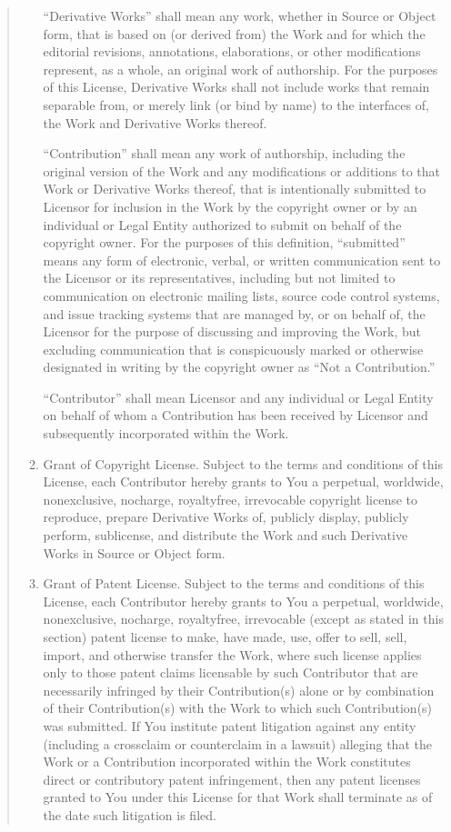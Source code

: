 \documentclass[letterpaper,10pt,english,openany,oneside]{sphinxmanual}
\begin{document}
\begin{quote}
\begin{enumerate}
“Derivative Works” shall mean any work, whether in Source or Object
form, that is based on (or derived from) the Work and for which the
editorial revisions, annotations, elaborations, or other modifications
represent, as a whole, an original work of authorship. For the purposes
of this License, Derivative Works shall not include works that remain
separable from, or merely link (or bind by name) to the interfaces of,
the Work and Derivative Works thereof.

“Contribution” shall mean any work of authorship, including
the original version of the Work and any modifications or additions
to that Work or Derivative Works thereof, that is intentionally
submitted to Licensor for inclusion in the Work by the copyright owner
or by an individual or Legal Entity authorized to submit on behalf of
the copyright owner. For the purposes of this definition, “submitted”
means any form of electronic, verbal, or written communication sent
to the Licensor or its representatives, including but not limited to
communication on electronic mailing lists, source code control systems,
and issue tracking systems that are managed by, or on behalf of, the
Licensor for the purpose of discussing and improving the Work, but
excluding communication that is conspicuously marked or otherwise
designated in writing by the copyright owner as “Not a Contribution.”

“Contributor” shall mean Licensor and any individual or Legal Entity
on behalf of whom a Contribution has been received by Licensor and
subsequently incorporated within the Work.

\item {} 
Grant of Copyright License. Subject to the terms and conditions of
this License, each Contributor hereby grants to You a perpetual,
worldwide, non\sphinxhyphen{}exclusive, no\sphinxhyphen{}charge, royalty\sphinxhyphen{}free, irrevocable
copyright license to reproduce, prepare Derivative Works of,
publicly display, publicly perform, sublicense, and distribute the
Work and such Derivative Works in Source or Object form.

\item {} 
Grant of Patent License. Subject to the terms and conditions of
this License, each Contributor hereby grants to You a perpetual,
worldwide, non\sphinxhyphen{}exclusive, no\sphinxhyphen{}charge, royalty\sphinxhyphen{}free, irrevocable
(except as stated in this section) patent license to make, have made,
use, offer to sell, sell, import, and otherwise transfer the Work,
where such license applies only to those patent claims licensable
by such Contributor that are necessarily infringed by their
Contribution(s) alone or by combination of their Contribution(s)
with the Work to which such Contribution(s) was submitted. If You
institute patent litigation against any entity (including a
cross\sphinxhyphen{}claim or counterclaim in a lawsuit) alleging that the Work
or a Contribution incorporated within the Work constitutes direct
or contributory patent infringement, then any patent licenses
granted to You under this License for that Work shall terminate
as of the date such litigation is filed.


\end{enumerate}
\end{quote}
\end{document}
